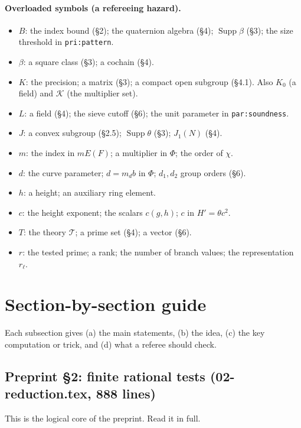 \documentclass[11pt]{article}
\theoremstyle{definition}
\newcommand{\Kmult}{\mathcal K}
\newcommand{\lbl}[1]{\texttt{#1}}
\newcommand{\src}[1]{\textsf{#1}}
\DeclareMathOperator{\Supp}{Supp}
\begin{document}
\paragraph{Overloaded symbols (a refereeing hazard).}
\begin{itemize}
\item $B$: the index bound (\S2); the quaternion algebra (\S4); $\Supp\beta$
(\S3); the size threshold in \lbl{pri:pattern}.
\item $\beta$: a square class (\S3); a cochain (\S4).
\item $K$: the precision; a matrix (\S3); a compact open subgroup (\S4.1).
Also $K_0$ (a field) and $\Kmult$ (the multiplier set).
\item $L$: a field (\S4); the sieve cutoff (\S6); the unit parameter in
\lbl{par:soundness}.
\item $J$: a convex subgroup (\S2.5); $\Supp\theta$ (\S3); $J_1(N)$ (\S4).
\item $m$: the index in $mE(F)$; a multiplier in $\Phi$; the order of $\chi$.
\item $d$: the curve parameter; $d=m_db$ in $\Phi$; $d_1,d_2$ group orders (\S6).
\item $h$: a height; an auxiliary ring element.
\item $c$: the height exponent; the scalars $c(g,h)$; $c$ in $H'=\theta c^2$.
\item $T$: the theory $\mathcal T$; a prime set (\S4); a vector (\S6).
\item $r$: the tested prime; a rank; the number of branch values; the representation $r_\ell$.
\end{itemize}

\section{Section-by-section guide}\label{sec:guide}

Each subsection gives (a) the main statements, (b) the idea, (c) the key
computation or trick, and (d) what a referee should check.

\subsection{Preprint \S2: finite rational tests (\src{02-reduction.tex}, 888 lines)}

This is the logical core of the preprint.  Read it in full.
\end{document}
